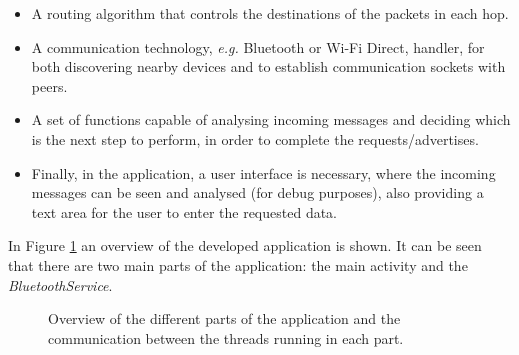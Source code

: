 \begin{itemize}
	\item A routing algorithm that controls the destinations of the packets in each hop.
	\item A communication technology, \textit{e.g.} Bluetooth or Wi-Fi Direct, handler, for both discovering nearby devices and to establish communication sockets with peers.
	\item A set of functions capable of analysing incoming messages and deciding which is the next step to perform, in order to complete the requests/advertises.
	\item Finally, in the application, a user interface is necessary, where the incoming messages can be seen and analysed (for debug purposes), also providing a text area for the user to enter the requested data.
\end{itemize}

In Figure \ref{fig:appsandbox} an overview of the developed application is shown. It can be seen that there are two main parts of the application: the main activity and the \textit{BluetoothService}.

\begin{figure}[ht]
	\noindent{}
	\caption{\label{fig:appsandbox} Overview of the different parts of the application and the communication between the threads running in each part.}
\end{figure}

